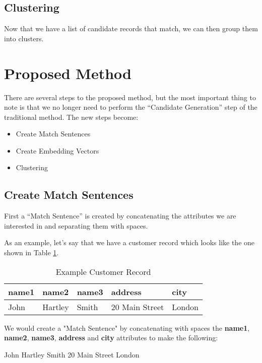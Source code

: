 \documentclass{article}
\begin{document}
\subsection{Clustering}
Now that we have a list of candidate records that match, we can then group them into clusters.

\section{Proposed Method}
\label{sec:proposedmethod}
There are several steps to the proposed method, but the most important thing to note is that we no longer need to perform the “Candidate Generation” step of the traditional method. The new steps become:
\begin{itemize}
\item Create Match Sentences
\item Create Embedding Vectors
\item Clustering
\end{itemize}

\subsection{Create Match Sentences}
First a “Match Sentence” is created by concatenating the attributes we are interested in and separating them with spaces.

As an example, let's say that we have a customer record which looks like the one shown in Table \ref{tab:examplecustomerrecord}. 

\begin{table}[h]
 \caption{Example Customer Record}
  \begin{tabular}{|l|l|l|l|l|}
    \hline
    \textbf{name1} & \textbf{name2} & \textbf{name3} & \textbf{address} & \textbf{city} \\
    \hline\hline
    John & Hartley & Smith & 20 Main Street & London \\
    \hline
  \end{tabular}
  \label{tab:examplecustomerrecord}
\end{table}

We would create a "Match Sentence" by concatenating with spaces the \textbf{name1}, \textbf{name2}, \textbf{name3}, \textbf{address} and \textbf{city} attributes to make the following:

\colorbox{shadecolor}{John Hartley Smith 20 Main Street London}
\end{document}
